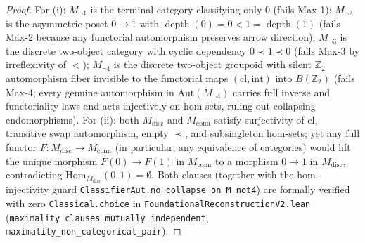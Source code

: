 \documentclass[11pt]{article}
\theoremstyle{plain}
\theoremstyle{definition}
\newcommand{\Hom}{\mathrm{Hom}}
\DeclareMathOperator{\dep}{depth}
\begin{document}
\begin{proof}
For (i): $M_{\neg 1}$ is the terminal category classifying only $0$ (fails Max-1); $M_{\neg 2}$ is the asymmetric poset $0 \to 1$ with $\dep(0) = 0 < 1 = \dep(1)$ (fails Max-2 because any functorial automorphism preserves arrow direction); $M_{\neg 3}$ is the discrete two-object category with cyclic dependency $0 \prec 1 \prec 0$ (fails Max-3 by irreflexivity of $<$); $M_{\neg 4}$ is the discrete two-object groupoid with silent $\mathbb{Z}_2$ automorphism fiber invisible to the functorial maps $(\mathrm{cl}, \mathrm{int})$ into $B(\mathbb{Z}_2)$ (fails Max-4; every genuine automorphism in $\mathrm{Aut}(M_{\neg 4})$ carries full inverse and functoriality laws and acts injectively on hom-sets, ruling out collapsing endomorphisms). For (ii): both $M_{\mathrm{disc}}$ and $M_{\mathrm{conn}}$ satisfy surjectivity of $\mathrm{cl}$, transitive swap automorphism, empty $\prec$, and subsingleton hom-sets; yet any full functor $F : M_{\mathrm{disc}} \to M_{\mathrm{conn}}$ (in particular, any equivalence of categories) would lift the unique morphism $F(0) \to F(1)$ in $M_{\mathrm{conn}}$ to a morphism $0 \to 1$ in $M_{\mathrm{disc}}$, contradicting $\Hom_{M_{\mathrm{disc}}}(0, 1) = \emptyset$. Both clauses (together with the hom-injectivity guard \texttt{ClassifierAut.no\_\allowbreak collapse\_\allowbreak on\_\allowbreak M\_not4}) are formally verified with zero \texttt{Classical.choice} in \texttt{FoundationalReconstructionV2.lean} (\texttt{maximality\_\allowbreak clauses\_\allowbreak mutually\_\allowbreak independent}, \texttt{maximality\_\allowbreak non\_\allowbreak categorical\_\allowbreak pair}).
\end{proof}
\end{document}
